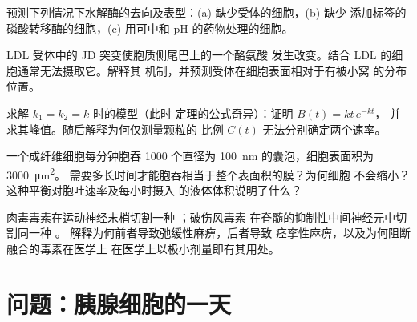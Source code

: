 \begin{exercise}[$\star\star$]\label{exo:b3:membrane-traffic:8}
预测下列情况下水解酶的去向及表型：(a)
缺少受体的细胞，(b) 缺少
添加标签的磷酸转移酶的细胞，(c) 用可中和
 pH 的药物处理的细胞。
\end{exercise}

\begin{exercise}[$\star\star$]\label{exo:b3:membrane-traffic:9}
LDL 受体中的 JD 突变使胞质侧尾巴上的一个酪氨酸
发生改变。结合 LDL 的细胞通常无法摄取它。解释其
机制，并预测受体在细胞表面相对于有被小窝
的分布位置。
\end{exercise}

\begin{exercise}[$\star\star\star$]\label{exo:b3:membrane-traffic:10}
求解 $k_{1} = k_{2} = k$ 时的模型（此时
定理的公式奇异）：证明 $B(t) = kt\,e^{-kt}$，
并求其峰值。随后解释为何仅测量颗粒的
比例 $C(t)$ 无法分别确定两个速率。
\end{exercise}

\begin{exercise}[$\star\star\star$]\label{exo:b3:membrane-traffic:11}
一个成纤维细胞每分钟胞吞 \num{1000} 个直径为 \qty{100}{nm}
的囊泡，细胞表面积为 \qty{3000}{\micro m^2}。
需要多长时间才能胞吞相当于整个表面积的膜？为何细胞
不会缩小？这种平衡对胞吐速率及每小时摄入
的液体体积说明了什么？
\end{exercise}

\begin{exercise}[$\star\star\star$]\label{exo:b3:membrane-traffic:12}
肉毒毒素在运动神经末梢切割一种 ；破伤风毒素
在脊髓的抑制性中间神经元中切割同一种 。
解释为何前者导致弛缓性麻痹，后者导致
痉挛性麻痹，以及为何阻断融合的毒素在医学上
在医学上以极小剂量即有其用处。
\end{exercise}

\section{问题：胰腺细胞的一天}

